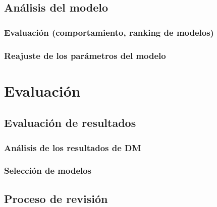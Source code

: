 \documentclass[11pt,a4paper]{tesis}
\begin{document}
\section{Análisis del modelo}
\subsection{Evaluación (comportamiento, ranking de modelos)}

\subsection{Reajuste de los parámetros del modelo}


\chapter{Evaluación}
\section{Evaluación de resultados}
\subsection{Análisis de los resultados de DM}
\label{resultados}
\subsection{Selección de modelos}

\section{Proceso de revisión}

\end{document}
